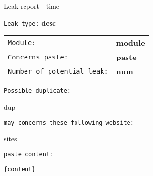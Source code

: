 \documentclass[12pt]{report}
\begin{document}
\begin{center}
{\LARGE Leak report - {time}}\\
\end{center}
\texttt{Leak type:} \textbf{ {desc} }\\

\begin{tabular}{ ll }
    \texttt{Module:} & \textbf{ {module} }\\
    \texttt{Concerns paste:} & \textbf{ {paste} }\\
    \texttt{Number of potential leak:} & \textbf{ {num} }\\
\end{tabular}

\texttt{Possible duplicate:}
\begin{itemize}
{dup}
\end{itemize}

\texttt{may concerns these following website:}
\begin{itemize}
{sites}
\end{itemize}

\texttt{paste content:}

\begin{lstlisting}
{content}
\end{lstlisting}
\end{document}
